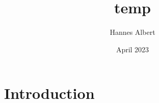 \documentclass{article}
\title{temp}
\author{Hannes Albert}
\date{April 2023}
\begin{document}
\maketitle

\section{Introduction}
\end{document}
